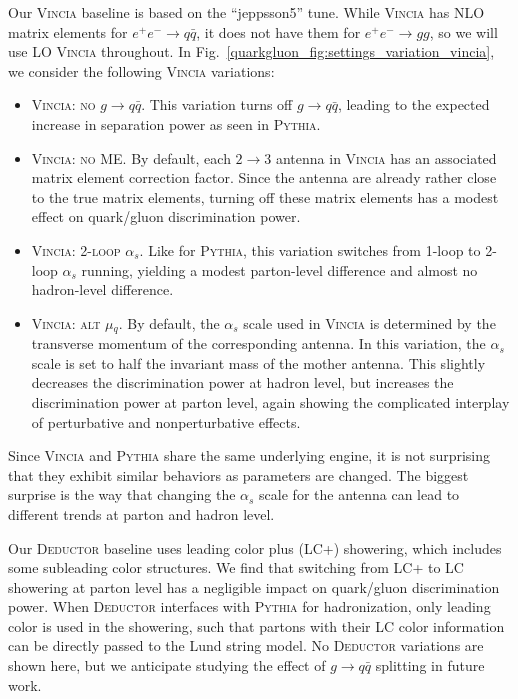 \documentclass[11pt]{cernrep}
\begin{document}
Our \textsc{Vincia} baseline is based on the ``jeppsson5'' tune.  While \textsc{Vincia} has NLO matrix elements for $e^+ e^- \to q \bar{q}$, it does not have them for $e^+ e^- \to gg$, so we will use LO \textsc{Vincia} throughout.  In Fig.~\ref{quarkgluon_fig:settings_variation_vincia}, we consider the following \textsc{Vincia} variations:
\begin{itemize}
\item \textsc{Vincia:  no $g \to q\bar{q}$}.  This variation turns off $g \to q \bar{q}$, leading to the expected increase in separation power as seen in \textsc{Pythia}.
\item \textsc{Vincia: no ME}.  By default, each $2 \to 3$ antenna in \textsc{Vincia} has an associated matrix element correction factor.  Since the antenna are already rather close to the true matrix elements, turning off these matrix elements has a modest effect on quark/gluon discrimination power.
\item \textsc{Vincia: 2-loop $\alpha_s$}.  Like for \textsc{Pythia}, this variation switches from 1-loop to 2-loop $\alpha_s$ running, yielding a modest parton-level difference and almost no hadron-level difference. 
\item \textsc{Vincia: alt $\mu_q$}.  By default, the $\alpha_s$ scale used in \textsc{Vincia} is determined by the transverse momentum of the corresponding antenna.  In this variation, the $\alpha_s$ scale is set to half the invariant mass of the mother antenna.  This slightly decreases the discrimination power at hadron level, but increases the discrimination power at parton level, again showing the complicated interplay of perturbative and nonperturbative effects.
\end{itemize}
Since \textsc{Vincia} and \textsc{Pythia} share the same underlying engine, it is not surprising that they exhibit similar behaviors as parameters are changed.  The biggest surprise is the way that changing the $\alpha_s$ scale for the antenna can lead to different trends at parton and hadron level.

Our \textsc{Deductor} baseline uses leading color plus (LC+) showering, which includes some subleading color structures. We find that switching from LC+ to LC showering at parton level has a negligible impact on quark/gluon discrimination power.  When \textsc{Deductor} interfaces with \textsc{Pythia} for hadronization, only leading color is used in the showering, such that partons with their LC color information can be directly passed to the Lund string model.  No  \textsc{Deductor} variations are shown here, but we anticipate studying the effect of $g \to q \bar{q}$ splitting in future work.
\end{document}

